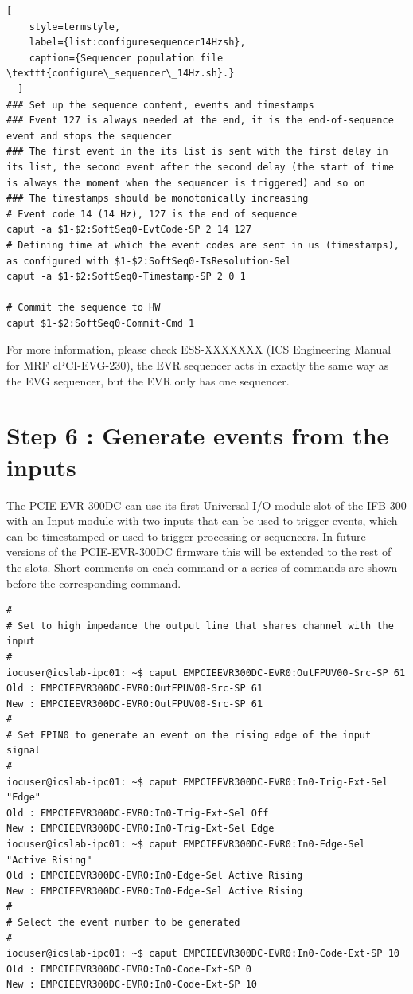 \documentclass[11pt
  , a4paper
  , article
  , oneside
  , showtrims
]{memoir}
\begin{document}
{\begin{lstlisting}[
    style=termstyle,
    label={list:configuresequencer14Hzsh},
    caption={Sequencer population file \texttt{configure\_sequencer\_14Hz.sh}.}
  ]
### Set up the sequence content, events and timestamps
### Event 127 is always needed at the end, it is the end-of-sequence event and stops the sequencer
### The first event in the its list is sent with the first delay in its list, the second event after the second delay (the start of time is always the moment when the sequencer is triggered) and so on
### The timestamps should be monotonically increasing
# Event code 14 (14 Hz), 127 is the end of sequence
caput -a $1-$2:SoftSeq0-EvtCode-SP 2 14 127
# Defining time at which the event codes are sent in us (timestamps), as configured with $1-$2:SoftSeq0-TsResolution-Sel
caput -a $1-$2:SoftSeq0-Timestamp-SP 2 0 1

# Commit the sequence to HW
caput $1-$2:SoftSeq0-Commit-Cmd 1
\end{lstlisting}
For more information, please check ESS-XXXXXXX (ICS Engineering Manual for MRF cPCI-EVG-230), the EVR sequencer acts in exactly the same way as the EVG sequencer, but the EVR only has one sequencer.


\section{Step 6 : Generate events from the inputs}
The PCIE-EVR-300DC can use its first Universal I/O module slot of the IFB-300 with an Input module with two inputs that can be used to trigger events, which can be timestamped or used to trigger processing or sequencers. In future versions of the PCIE-EVR-300DC firmware this will be extended to the rest of the slots. Short comments on each command or a series of commands are shown before the corresponding command.
\begin{lstlisting}[style=termstyle]
#
# Set to high impedance the output line that shares channel with the input
#
iocuser@icslab-ipc01: ~$ caput EMPCIEEVR300DC-EVR0:OutFPUV00-Src-SP 61
Old : EMPCIEEVR300DC-EVR0:OutFPUV00-Src-SP 61
New : EMPCIEEVR300DC-EVR0:OutFPUV00-Src-SP 61
#
# Set FPIN0 to generate an event on the rising edge of the input signal
#
iocuser@icslab-ipc01: ~$ caput EMPCIEEVR300DC-EVR0:In0-Trig-Ext-Sel "Edge"
Old : EMPCIEEVR300DC-EVR0:In0-Trig-Ext-Sel Off
New : EMPCIEEVR300DC-EVR0:In0-Trig-Ext-Sel Edge
iocuser@icslab-ipc01: ~$ caput EMPCIEEVR300DC-EVR0:In0-Edge-Sel "Active Rising"
Old : EMPCIEEVR300DC-EVR0:In0-Edge-Sel Active Rising
New : EMPCIEEVR300DC-EVR0:In0-Edge-Sel Active Rising
#
# Select the event number to be generated
#
iocuser@icslab-ipc01: ~$ caput EMPCIEEVR300DC-EVR0:In0-Code-Ext-SP 10
Old : EMPCIEEVR300DC-EVR0:In0-Code-Ext-SP 0
New : EMPCIEEVR300DC-EVR0:In0-Code-Ext-SP 10
\end{lstlisting}



}
\end{document}
